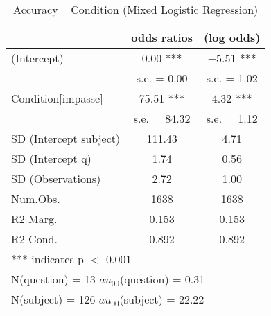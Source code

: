 \begin{table}

\caption{Accuracy ~ Condition (Mixed Logistic Regression)}
\centering
\begin{tabular}[t]{lcc}
\toprule
  & odds ratios & (log odds)\\
\midrule
(Intercept) & \num{0.00} *** & \num{-5.51} ***\\
 & s.e. = \num{0.00} & s.e. = \num{1.02}\\
Condition[impasse] & \num{75.51} *** & \num{4.32} ***\\
 & s.e. = \num{84.32} & s.e. = \num{1.12}\\
SD (Intercept subject) & \num{111.43} & \num{4.71}\\
SD (Intercept q) & \num{1.74} & \num{0.56}\\
SD (Observations) & \num{2.72} & \num{1.00}\\
\midrule
Num.Obs. & \num{1638} & \num{1638}\\
R2 Marg. & \num{0.153} & \num{0.153}\\
R2 Cond. & \num{0.892} & \num{0.892}\\
\bottomrule
\multicolumn{3}{l}{\rule{0pt}{1em}*** indicates p $<$ 0.001}\\
\multicolumn{3}{l}{\rule{0pt}{1em}N(question) = 13 $	au_{00}$(question) = 0.31}\\
\multicolumn{3}{l}{\rule{0pt}{1em}N(subject) = 126 $	au_{00}$(subject) = 22.22}\\
\end{tabular}
\end{table}
